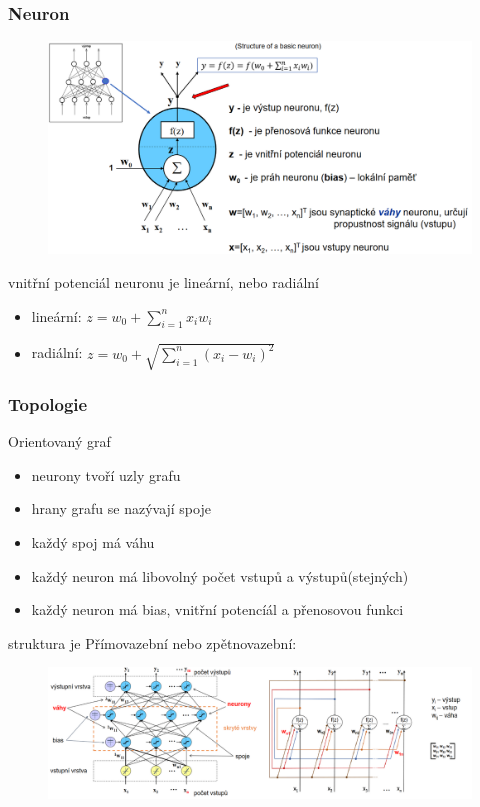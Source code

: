 \subsubsection{Neuron}
\begin{figure}[H]
    \includegraphics[scale = 0.5]{images/neuron.png}
\end{figure}
vnitřní potenciál neuronu je lineární, nebo radiální
\begin{itemize}
    \item lineární: $z = w_0 + \sum^n_{i=1}x_iw_i$
    \item radiální: $z = w_0 + \sqrt{\sum^n_{i=1}(x_i-w_i)^2}$
\end{itemize}

\subsubsection{Topologie}
Orientovaný graf
\begin{itemize}
    \item neurony tvoří uzly grafu
    \item hrany grafu se nazývají spoje
    \item každý spoj má váhu
    \item každý neuron má libovolný počet vstupů a výstupů(stejných)
    \item každý neuron má bias, vnitřní potencíál a přenosovou funkci
\end{itemize}
struktura je Přímovazební nebo zpětnovazební:
\begin{figure}[H]
    \includegraphics[scale = 0.5]{images/struktury.png}
\end{figure}

